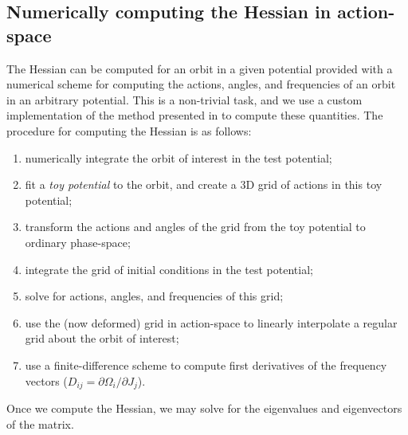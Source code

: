 \documentclass[letterpaper,12pt,preprint]{aastex}
\begin{document}
\subsection{Numerically computing the Hessian in action-space}
The Hessian can be computed for an orbit in a given potential provided with a numerical scheme for computing the actions, angles, and frequencies of an orbit in an arbitrary potential. This is a non-trivial task, and we use a custom implementation of the method presented in \citep{sanders14} to compute these quantities. The procedure for computing the Hessian is as follows:
\begin{enumerate}
	\item numerically integrate the orbit of interest in the test potential;
	\item fit a \emph{toy potential} \citep[see][]{sanders14} to the orbit, and create a 3D grid of actions in this toy potential;
	\item transform the actions and angles of the grid from the toy potential to ordinary phase-space;
	\item integrate the grid of initial conditions in the test potential;
	\item solve for actions, angles, and frequencies of this grid;
	\item use the (now deformed) grid in action-space to linearly interpolate a regular grid about the orbit of interest;
	\item use a finite-difference scheme to compute first derivatives of the frequency vectors ($D_{ij} = \partial \Omega_i / \partial J_j$).
\end{enumerate}
Once we compute the Hessian, we may solve for the eigenvalues and eigenvectors of the matrix. 
\end{document}
